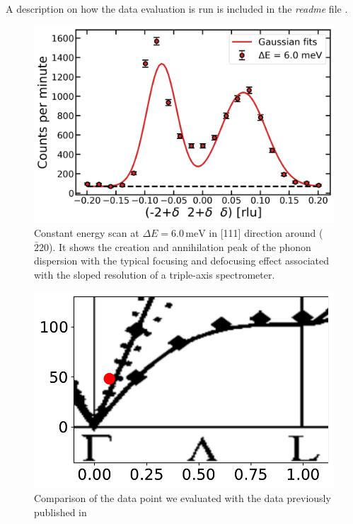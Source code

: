 \documentclass[aps,prx,reprint,amsmath,amssymb,superscriptaddress,showpacs]{revtex4-1}
\begin{document}
A description on how the data evaluation is run is included in the \emph{readme} file \cite{data-evaluation}.


\begin{figure}
    \includegraphics[width=1.0\linewidth]{mini-school-si-cescan.png}
    \caption{\label{fig1} Constant energy scan at $\Delta E = 6.0\,\mathrm{meV}$ in [111] direction around ($\bar{2}20$). It shows the creation and annihilation peak of the phonon dispersion with the typical focusing and defocusing effect associated with the sloped resolution of a triple-axis spectrometer.}
\end{figure}

\begin{figure}
    \includegraphics[width=1.0\linewidth]{dispersion.pdf}
    \caption{Comparison of the data point we evaluated with the data previously published in \cite{Aouissi} }
    \label{fig2}
\end{figure}
\end{document}
